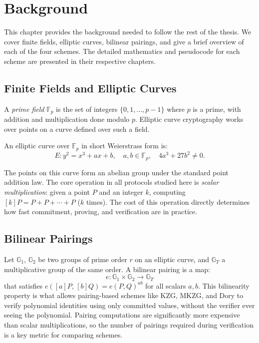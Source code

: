 \chapter{Background}
\label{chap:background}

This chapter provides the background needed to follow the rest of the
thesis. We cover finite fields, elliptic curves, bilinear pairings,
and give a brief overview of each of the four schemes. The detailed
mathematics and pseudocode for each scheme are presented in their
respective chapters.
 
\section{Finite Fields and Elliptic Curves}
\label{sec:fields-curves}
 
A \emph{prime field} $\mathbb{F}_p$ is the set of integers
$\{0, 1, \ldots, p-1\}$ where $p$ is a prime, with addition and
multiplication done modulo $p$. Elliptic curve cryptography works
over points on a curve defined over such a field.
 
An elliptic curve over $\mathbb{F}_p$ in short Weierstrass form is:
\begin{equation}
    E : y^2 = x^3 + ax + b,
    \quad a, b \in \mathbb{F}_p,
    \quad 4a^3 + 27b^2 \neq 0.
    \label{eq:weierstrass}
\end{equation}
 
The points on this curve form an abelian group under the standard
point addition law. The core operation in all protocols studied here
is \emph{scalar multiplication}: given a point $P$ and an integer
$k$, computing $[k]P = P + P + \cdots + P$ ($k$ times). The cost of
this operation directly determines how fast commitment, proving, and
verification are in practice.
 
\section{Bilinear Pairings}
\label{sec:pairings}
 
Let $\mathbb{G}_1$, $\mathbb{G}_2$ be two groups of prime order $r$
on an elliptic curve, and $\mathbb{G}_T$ a multiplicative group of
the same order. A bilinear pairing is a map:
\begin{equation}
    e : \mathbb{G}_1 \times \mathbb{G}_2 \longrightarrow \mathbb{G}_T
\end{equation}
that satisfies $e([a]P,\, [b]Q) = e(P,Q)^{ab}$ for all scalars
$a, b$. This bilinearity property is what allows pairing-based
schemes like KZG, MKZG, and Dory to verify polynomial identities
using only committed values, without the verifier ever seeing the
polynomial. Pairing computations are significantly more expensive
than scalar multiplications, so the number of pairings required
during verification is a key metric for comparing schemes.
 
